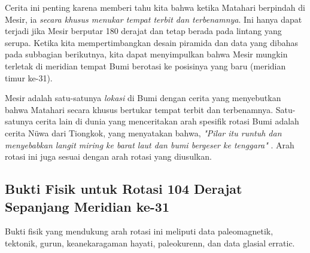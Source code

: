 \documentclass[10pt,twocolumn,letterpaper]{article}
\begin{document}
Cerita ini penting karena memberi tahu kita bahwa ketika Matahari berpindah di Mesir, ia \textit{secara khusus menukar tempat terbit dan terbenamnya}. Ini hanya dapat terjadi jika Mesir berputar 180 derajat dan tetap berada pada lintang yang serupa. Ketika kita mempertimbangkan desain piramida dan data yang dibahas pada subbagian berikutnya, kita dapat menyimpulkan bahwa Mesir mungkin terletak di meridian tempat Bumi berotasi ke posisinya yang baru (meridian timur ke-31).

Mesir adalah satu-satunya \textit{lokasi} di Bumi dengan cerita yang menyebutkan bahwa Matahari secara khusus bertukar tempat terbit dan terbenamnya. Satu-satunya cerita lain di dunia yang menceritakan arah spesifik rotasi Bumi adalah cerita Nüwa dari Tiongkok, yang menyatakan bahwa, \textit{"Pilar itu runtuh dan menyebabkan langit miring ke barat laut dan bumi bergeser ke tenggara"} \cite{8}. Arah rotasi ini juga sesuai dengan arah rotasi yang diusulkan.

\subsection{Bukti Fisik untuk Rotasi 104 Derajat Sepanjang Meridian ke-31}

Bukti fisik yang mendukung arah rotasi ini meliputi data paleomagnetik, tektonik, gurun, keanekaragaman hayati, paleokurenn, dan data glasial erratic.
\end{document}
